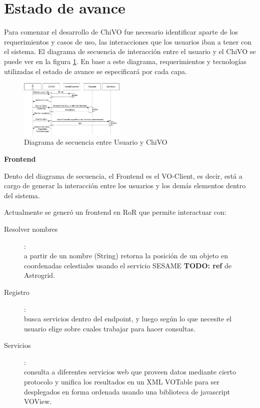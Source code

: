 \section{Estado de avance}

Para comenzar el desarrollo de ChiVO fue necesario identificar aparte de los
requerimientos y casos de uso, las interacciones que los usuarios iban a tener
con el sistema. El diagrama de secuencia de interacción entre el usuario y el
ChiVO se puede ver en la figura \ref{fig:secuencia}.
En base a este diagrama, requerimientos y tecnologías utilizadas el estado de
avance se especificará por cada capa.

\begin{figure}[h!t]
    \centering
    \includegraphics[width=0.45\textwidth]{images/secuencia.png}
    \caption{Diagrama de secuencia entre Usuario y ChiVO}
    \label{fig:secuencia}
\end{figure}

\textbf{Frontend}

Dento del diagrama de secuencia, el Frontend es el VO-Client, es decir, está a cargo
de generar la interacción entre los usuarios y los demás elementos dentro del
sistema.

Actualmente se generó un frontend en RoR que permite interactuar con:

\begin{description}
    \item[Resolver nombres]:\hfill \\
        a partir de un nombre (String) retorna la posición de un objeto en
        coordenadas celestiales usando el servicio SESAME \textbf{TODO: ref} de
        Astrogrid.
    \item[Registro]: \hfill \\
        busca servicios dentro del endpoint, y luego según lo que necesite el
        usuario elige sobre cuales trabajar para hacer consultas.
    \item[Servicios]: \hfill \\
        consulta a diferentes servicios web que proveen datos mediante cierto
        protocolo y unifica los resultados en un XML VOTable para ser desplegados
        en forma ordenada usando una biblioteca de javascript VOView.
\end{description}


